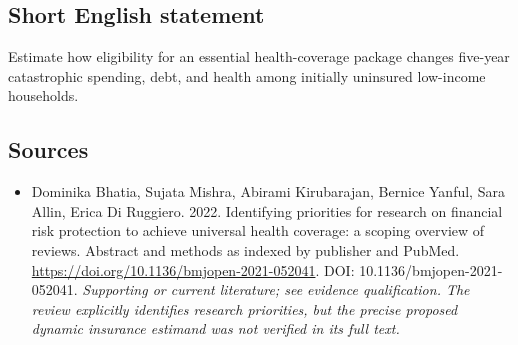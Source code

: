 \documentclass[11pt]{article}
\begin{document}
\subsection{Short English statement}
Estimate how eligibility for an essential health-coverage package changes five-year catastrophic spending, debt, and health among initially uninsured low-income households.

\subsection{Sources}
\begin{itemize}\raggedright
\item[\textnormal{[S1]}]\hypertarget{source:30007731:1}{} Dominika Bhatia, Sujata Mishra, Abirami Kirubarajan, Bernice Yanful, Sara Allin, Erica Di Ruggiero. 2022. Identifying priorities for research on financial risk protection to achieve universal health coverage: a scoping overview of reviews. Abstract and methods as indexed by publisher and PubMed.
\url{https://doi.org/10.1136/bmjopen-2021-052041}.
DOI: 10.1136/bmjopen-2021-052041.
{\small\textit{Supporting or current literature; see evidence qualification. The review explicitly identifies research priorities, but the precise proposed dynamic insurance estimand was not verified in its full text.}}
\end{itemize}
\end{document}

